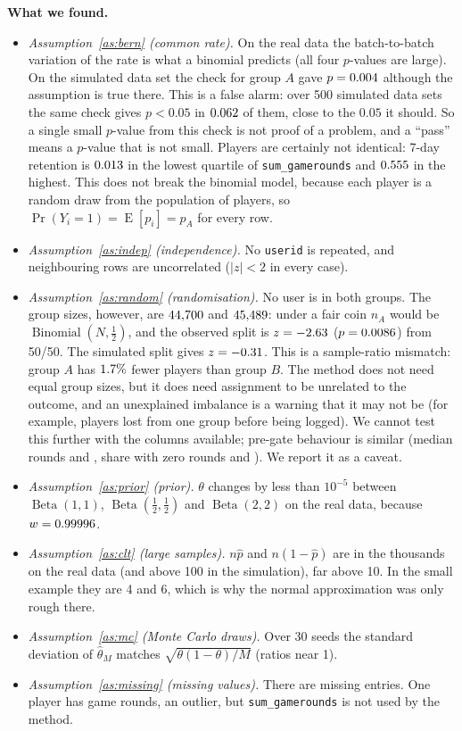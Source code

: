 \documentclass[11pt]{article}
\theoremstyle{definition}
\theoremstyle{remark}
\renewcommand{\Pr}{\operatorname{Pr}}
\newcommand{\E}{\operatorname{E}}
\newcommand{\Bin}{\operatorname{Binomial}}
\newcommand{\Betad}{\operatorname{Beta}}
\begin{document}
\textbf{What we found.}
\begin{itemize}[nosep]
\item \emph{Assumption~\ref{as:bern} (common rate).} On the real data the batch-to-batch variation of the rate is
  what a binomial predicts (all four $p$-values are large). On the simulated data set the check for group $A$ gave
  $p=0.004$ although the assumption is true there. This is a false alarm: over 500 simulated data sets the same
  check gives $p<0.05$ in $0.062$ of them, close to the $0.05$ it should. So a single small $p$-value from this
  check is not proof of a problem, and a ``pass'' means a $p$-value that is not small.
  Players are certainly not identical: 7-day retention is $0.013$ in the lowest quartile of
  \texttt{sum\_gamerounds} and $0.555$ in the highest. This does not break the binomial model, because each
  player is a random draw from the population of players, so $\Pr(Y_i=1)=\E[p_i]=p_A$ for every row.
\item \emph{Assumption~\ref{as:indep} (independence).} No \texttt{userid} is repeated, and neighbouring rows are
  uncorrelated ($|z|<2$ in every case).
\item \emph{Assumption~\ref{as:random} (randomisation).} No user is in both groups. The group sizes, however, are
  $44{,}700$ and $45{,}489$: under a fair coin $n_A$ would be $\Bin(N,\frac12)$, and the observed split is
  $z=-2.63$ ($p=0.0086$) from 50/50. The simulated split gives $z=-0.31$. This is a sample-ratio
  mismatch: group $A$ has $1.7\%$ fewer players than group $B$. The method does not need equal group sizes, but it does need assignment to be unrelated
  to the outcome, and an unexplained imbalance is a warning that it may not be (for example, players lost from one
  group before being logged). We cannot test this further with the columns available; pre-gate behaviour is similar
  (median rounds \asMedA{} and \asMedB, share with zero rounds \asZeroA{} and \asZeroB). We report it as a caveat.
\item \emph{Assumption~\ref{as:prior} (prior).} $\theta$ changes by less than $10^{-5}$ between $\Betad(1,1)$,
  $\Betad(\frac12,\frac12)$ and $\Betad(2,2)$ on the real data, because $w=0.99996$.
\item \emph{Assumption~\ref{as:clt} (large samples).} $n\hat p$ and $n(1-\hat p)$ are in the thousands on the real
  data (and above 100 in the simulation), far above 10. In the small example they are 4 and 6, which is why the
  normal approximation was only rough there.
\item \emph{Assumption~\ref{as:mc} (Monte Carlo draws).} Over 30 seeds the standard deviation of $\hat\theta_M$
  matches $\sqrt{\theta(1-\theta)/M}$ (ratios near 1).
\item \emph{Assumption~\ref{as:missing} (missing values).} There are \asMissing{} missing entries. One player has
  \asMaxRounds{} game rounds, an outlier, but \texttt{sum\_gamerounds} is not used by the method.
\end{itemize}
\end{document}
